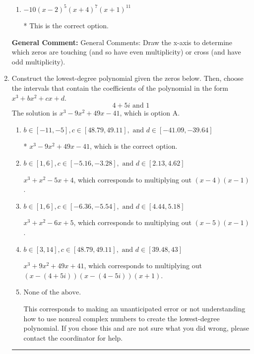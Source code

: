 \documentclass{extbook}[14pt]
\newcommand{\litem}[1]{\item #1

\rule{\textwidth}{0.4pt}}
\begin{document}
\begin{enumerate}
{\begin{enumerate}[label=\Alph*.]
This corresponds to the leading coefficient being the opposite value than it should be.
\item \( -10(x - 2)^{5} (x + 4)^{7} (x + 1)^{11} \)

* This is the correct option.
\end{enumerate}

\textbf{General Comment:} General Comments: Draw the x-axis to determine which zeros are touching (and so have even multiplicity) or cross (and have odd multiplicity).
}
\litem{
Construct the lowest-degree polynomial given the zeros below. Then, choose the intervals that contain the coefficients of the polynomial in the form $x^3+bx^2+cx+d$.
\[ 4 + 5 i \text{ and } 1 \]The solution is \( x^{3} -9 x^{2} +49 x -41 \), which is option A.\begin{enumerate}[label=\Alph*.]
\item \( b \in [-11, -5], c \in [48.79, 49.11], \text{ and } d \in [-41.09, -39.64] \)

* $x^{3} -9 x^{2} +49 x -41$, which is the correct option.
\item \( b \in [1, 6], c \in [-5.16, -3.28], \text{ and } d \in [2.13, 4.62] \)

$x^{3} + x^{2} -5 x + 4$, which corresponds to multiplying out $(x -4)(x -1)$.
\item \( b \in [1, 6], c \in [-6.36, -5.54], \text{ and } d \in [4.44, 5.18] \)

$x^{3} + x^{2} -6 x + 5$, which corresponds to multiplying out $(x -5)(x -1)$.
\item \( b \in [3, 14], c \in [48.79, 49.11], \text{ and } d \in [39.48, 43] \)

$x^{3} +9 x^{2} +49 x + 41$, which corresponds to multiplying out $(x-(4 + 5 i))(x-(4 - 5 i))(x + 1)$.
\item \( \text{None of the above.} \)

This corresponds to making an unanticipated error or not understanding how to use nonreal complex numbers to create the lowest-degree polynomial. If you chose this and are not sure what you did wrong, please contact the coordinator for help.
\end{enumerate}

}
\end{enumerate}
\end{document}
